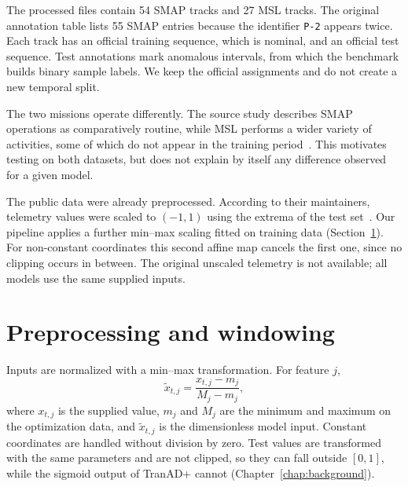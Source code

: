 The processed files contain \num{54} \ac{SMAP} tracks and \num{27} \ac{MSL}
tracks. The original annotation table lists \num{55} \ac{SMAP} entries
because the identifier \texttt{P-2} appears twice. Each track has an
official training sequence, which is nominal, and an official test sequence.
Test annotations mark anomalous intervals, from which the benchmark builds
binary sample labels. We keep the official assignments and do not create a
new temporal split.

The two missions operate differently. The source study describes \ac{SMAP}
operations as comparatively routine, while \ac{MSL} performs a wider variety
of activities, some of which do not appear in the training
period~\cite{Hundman2018Spacecraft}. This motivates testing on both datasets,
but does not explain by itself any difference observed for a given model.

The public data were already preprocessed. According to their maintainers,
telemetry values were scaled to \((-1,1)\) using the extrema of the test
set~\cite{TelemanomReferenceData}. Our pipeline applies a further min--max
scaling fitted on training data (Section~\ref{sec:datasets-preprocessing}).
For non-constant coordinates this second affine map cancels the first one,
since no clipping occurs in between. The original unscaled telemetry is not
available; all models use the same supplied inputs.

\section{Preprocessing and windowing}
\label{sec:datasets-preprocessing}

Inputs are normalized with a min--max transformation. For feature \(j\),
\begin{equation}
  \widetilde{x}_{t,j} =
  \frac{x_{t,j}-m_j}{M_j-m_j},
  \label{eq:datasets-normalization}
\end{equation}
where \(x_{t,j}\) is the supplied value, \(m_j\) and \(M_j\) are the minimum
and maximum on the optimization data, and \(\widetilde{x}_{t,j}\) is the
dimensionless model input. Constant coordinates are handled without division
by zero. Test values are transformed with the same parameters and are not
clipped, so they can fall outside \([0,1]\), while the sigmoid output of
TranAD+ cannot (Chapter~\ref{chap:background}).

